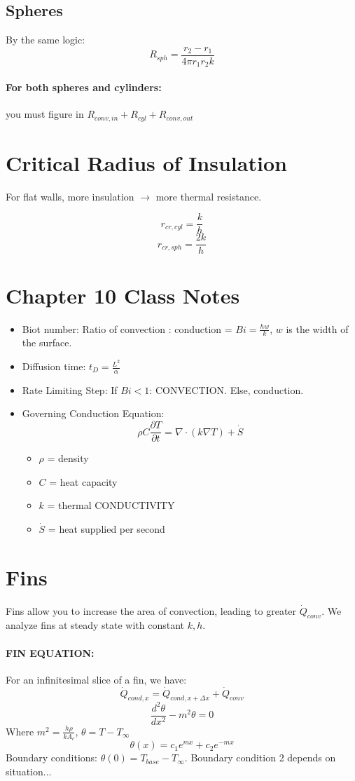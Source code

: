 \documentclass[a4paper,12pt]{report}
\begin{document}
\subsection{Spheres}
By the same logic: $$R_{sph} = \frac{r_2-r_1}{4\pi r_1 r_2 k}$$

\paragraph{For both spheres and cylinders: } you must figure in $R_{conv, in} + R_{cyl} + R_{conv, out}$

\section{Critical Radius of Insulation}
For flat walls, more insulation $\to$ more thermal resistance.

$$r_{cr,cyl} = \frac{k}{h}$$
$$r_{cr,sph} = \frac{2k}{h}$$

\section{Chapter 10 Class Notes}
\begin{itemize}
\item Biot number: Ratio of convection : conduction = $Bi = \frac{hw}{k}$, $w$ is the width of the surface.
\item Diffusion time: $t_D = \frac{L^2}{\alpha}$
\item Rate Limiting Step: If $Bi < 1$: CONVECTION. Else, conduction. 
\item Governing Conduction Equation: $$\rho C\frac{\partial T}{\partial t} = \nabla \cdot(k\nabla T) + \dot{S}$$
\begin{itemize}
\item $\rho$ = density
\item $C$ = heat capacity
\item $k$ = thermal CONDUCTIVITY
\item $\dot{S}$ = heat supplied per second
\end{itemize}
\end{itemize}

\section{Fins}
Fins allow you to increase the area of convection, leading to greater $\dot{Q}_{conv}$. We analyze fins at steady state with constant $k, h$. 

\paragraph{FIN EQUATION: } For an infinitesimal slice of a fin, we have: 
$$\dot{Q}_{cond, x} = \dot{Q}_{cond, x + \Delta x} + \dot{Q}_{conv}$$
$$\frac{d^2\theta}{dx^2} - m^2\theta = 0$$
Where $m^2 = \frac{h\rho}{kA_c}$, $\theta = T-T_\infty$
$$\theta(x) = c_1e^{mx} + c_2e^{-mx}$$
Boundary conditions: $\theta(0) = T_{base} - T_\infty$. Boundary condition 2 depends on situation...
\end{document}
